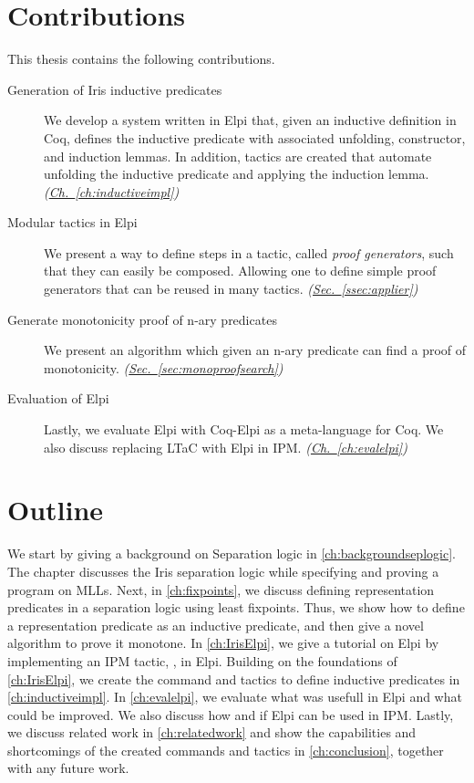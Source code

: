 \documentclass[thesis.tex]{subfiles}
\begin{document}
\section{Contributions}
This thesis contains the following contributions.
\begin{description}
  \item[Generation of Iris inductive predicates] We develop a system written in Elpi that, given an inductive definition in Coq, defines the inductive predicate with associated unfolding, constructor, and induction lemmas. In addition, tactics are created that automate unfolding the inductive predicate and applying the induction lemma. \emph{(\hyperref[ch:inductiveimpl]{Ch.~\ref*{ch:inductiveimpl}})}
  \item[Modular tactics in Elpi] We present a way to define steps in a tactic, called \emph{proof generators}, such that they can easily be composed. Allowing one to define simple proof generators that can be reused in many tactics. \emph{(\hyperref[ssec:applier]{Sec.~\ref*{ssec:applier}})}
  \item[Generate monotonicity proof of n-ary predicates] We present an algorithm which given an n-ary predicate can find a proof of monotonicity. \emph{(\hyperref[sec:monoproofsearch]{Sec.~\ref*{sec:monoproofsearch}})}
  \item[Evaluation of Elpi] Lastly, we evaluate Elpi with Coq-Elpi as a meta-language for Coq. We also discuss replacing LTaC with Elpi in IPM. \emph{(\hyperref[ch:evalelpi]{Ch.~\ref*{ch:evalelpi}})}
\end{description}

\section{Outline}
We start by giving a background on Separation logic in \cref{ch:backgroundseplogic}. The chapter discusses the Iris separation logic while specifying and proving a program on MLLs. Next, in \cref{ch:fixpoints}, we discuss defining representation predicates in a separation logic using least fixpoints. Thus, we show how to define a representation predicate as an inductive predicate, and then give a novel algorithm to prove it monotone. In \cref{ch:IrisElpi}, we give a tutorial on Elpi by implementing an IPM tactic, , in Elpi. Building on the foundations of \cref{ch:IrisElpi}, we create the command and tactics to define inductive predicates in \cref{ch:inductiveimpl}. In \cref{ch:evalelpi}, we evaluate what was usefull in Elpi and what could be improved. We also discuss how and if Elpi can be used in IPM. Lastly, we discuss related work in \cref{ch:relatedwork} and show the capabilities and shortcomings of the created commands and tactics in \cref{ch:conclusion}, together with any future work.
\end{document}
